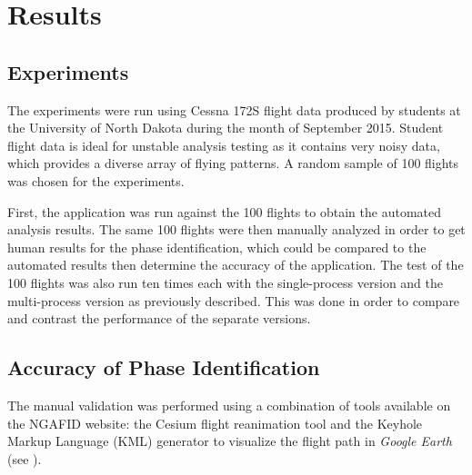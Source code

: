 \chapter{Results} \label{ch:results}

\section{Experiments}

	The experiments were run using Cessna 172S flight data produced by students at the University of North Dakota during the month of September 2015.  Student flight data is ideal for unstable analysis testing as it contains very noisy data, which provides a diverse array of flying patterns.  A random sample of 100 flights was chosen for the experiments.
        
    First, the application was run against the 100 flights to obtain the automated analysis results.  The same 100 flights were then manually analyzed in order to get human results for the phase identification, which could be compared to the automated results then determine the accuracy of the application.  The test of the 100 flights was also run ten times each with the single-process version and the multi-process version as previously described.  This was done in order to compare and contrast the performance of the separate versions.


\section{Accuracy of Phase Identification}

	The manual validation was performed using a combination of tools available on the NGAFID website:  the Cesium flight reanimation tool and the Keyhole Markup Language (KML) generator to visualize the flight path in \textit{Google Earth}~\cite{nolan2014keyhole} (see ).
    
